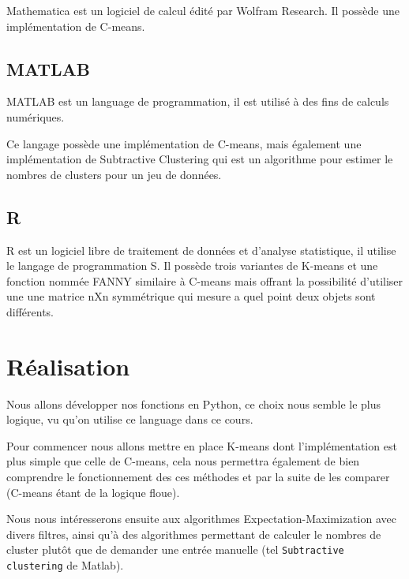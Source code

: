 \documentclass{article}
\begin{document}
  Mathematica est un logiciel de calcul édité par Wolfram Research. Il possède une implémentation de C-means.

  \subsection{MATLAB}

  MATLAB est un language de programmation, il est utilisé à des fins de calculs numériques.

  Ce langage possède une implémentation de C-means,
  mais également une implémentation de Subtractive Clustering
  qui est un algorithme pour estimer le nombres de clusters pour un jeu de données.


  \subsection{R}

  R est un logiciel libre de traitement de données et d'analyse statistique, il utilise le langage de programmation S.
  Il possède trois variantes de K-means et une fonction nommée FANNY similaire à C-means mais offrant la possibilité d'utiliser une
  une matrice nXn symmétrique qui mesure a quel point deux objets sont différents.


  \section{Réalisation}

  Nous allons développer nos fonctions en Python, ce choix nous semble le plus logique, vu qu'on utilise ce language dans ce cours.

  Pour commencer nous allons mettre en place K-means dont l'implémentation est plus simple que celle de C-means,
  cela nous permettra également de bien comprendre le fonctionnement des ces méthodes et par la suite de les comparer (C-means étant de la logique floue).

  Nous nous intéresserons ensuite aux algorithmes Expectation-Maximization avec divers filtres, ainsi qu'à des algorithmes permettant de calculer le nombres de cluster plutôt que de demander une entrée manuelle (tel \texttt{Subtractive clustering} de Matlab).


\nocite{*}
\end{document}
